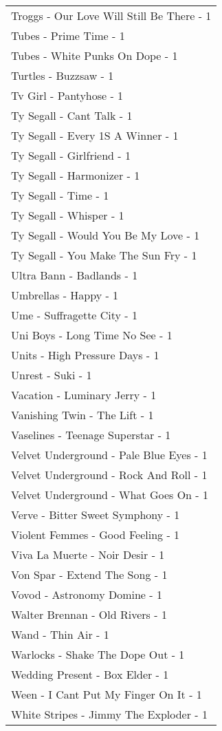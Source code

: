 \documentclass[
]{article}
\begin{document}
\begin{longtable}{l}
Troggs - Our Love Will Still Be There - 1 \\ 
Tubes - Prime Time - 1 \\ 
Tubes - White Punks On Dope - 1 \\ 
Turtles - Buzzsaw - 1 \\ 
Tv Girl - Pantyhose - 1 \\ 
Ty Segall - Cant Talk - 1 \\ 
Ty Segall - Every 1S A Winner - 1 \\ 
Ty Segall - Girlfriend - 1 \\ 
Ty Segall - Harmonizer - 1 \\ 
Ty Segall - Time - 1 \\ 
Ty Segall - Whisper - 1 \\ 
Ty Segall - Would You Be My Love - 1 \\ 
Ty Segall - You Make The Sun Fry - 1 \\ 
Ultra Bann - Badlands - 1 \\ 
Umbrellas - Happy - 1 \\ 
Ume - Suffragette City - 1 \\ 
Uni Boys - Long Time No See - 1 \\ 
Units - High Pressure Days - 1 \\ 
Unrest - Suki - 1 \\ 
Vacation - Luminary Jerry - 1 \\ 
Vanishing Twin - The Lift - 1 \\ 
Vaselines - Teenage Superstar - 1 \\ 
Velvet Underground - Pale Blue Eyes - 1 \\ 
Velvet Underground - Rock And Roll - 1 \\ 
Velvet Underground - What Goes On - 1 \\ 
Verve - Bitter Sweet Symphony - 1 \\ 
Violent Femmes - Good Feeling - 1 \\ 
Viva La Muerte - Noir Desir - 1 \\ 
Von Spar - Extend The Song - 1 \\ 
Vovod - Astronomy Domine - 1 \\ 
Walter Brennan - Old Rivers - 1 \\ 
Wand - Thin Air - 1 \\ 
Warlocks - Shake The Dope Out - 1 \\ 
Wedding Present - Box Elder - 1 \\ 
Ween - I Cant Put My Finger On It - 1 \\ 
White Stripes - Jimmy The Exploder - 1 \\ 

\end{longtable}
\end{document}

